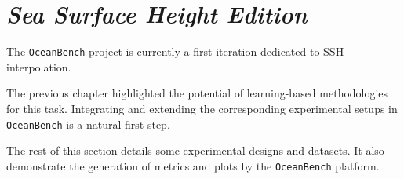 \section{\textit{Sea Surface Height Edition}}\label{sec:interp_challenge}
The \texttt{OceanBench} project is currently a first iteration dedicated to SSH interpolation.

The previous chapter highlighted the potential of learning-based methodologies for this task. Integrating and extending the corresponding experimental setups in \texttt{OceanBench} is a natural first step.

The rest of this section details some experimental designs and datasets. It also demonstrate the generation of metrics and plots by the \texttt{OceanBench} platform. 



